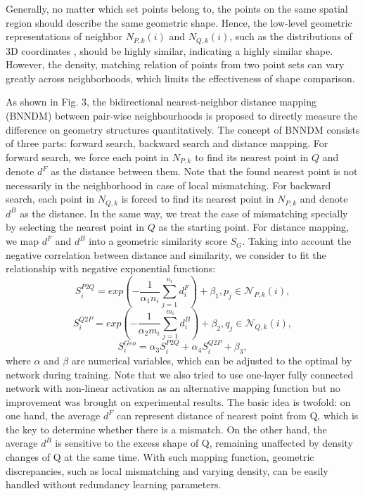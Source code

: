 \documentclass[letterpaper, 10 pt, conference]{ieeeconf}
\begin{document}
Generally, no matter which set points belong to, the points on the same spatial region should describe the same geometric shape. Hence, the low-level geometric representations of neighbor $N_{P,k}(i)$ and $N_{Q,k}(i)$, such as the distributions of 3D coordinates , should be highly similar, indicating a highly similar shape. However, the density, matching relation of points from two point sets can vary greatly across neighborhoods, which limits the effectiveness of shape comparison. 



As shown in Fig. 3, the bidirectional nearest-neighbor distance mapping (BNNDM) between pair-wise neighbourhoods is proposed to directly measure the difference on geometry structures quantitatively. The concept of BNNDM consists of three parts: forward search, backward search and distance mapping. For forward search, we force each point in $N_{P,k}$ to find its nearest point in $Q$ and denote $d^{F}$  as the distance between them. Note that the found nearest point is not necessarily in the neighborhood in case of local mismatching. For backward search, each point in $N_{Q,k}$ is forced to find its nearest point in $N_{P,k}$ and denote $d^{B}$ as the distance. In the same way, we treat the case of mismatching specially by selecting the nearest point in $Q$ as the starting point. For distance mapping, we map $d^{F}$ and $d^{B}$ into a geometric similarity score $S_{G}$. Taking into account the negative correlation between distance and similarity, we consider to fit the relationship with negative exponential functions:
\begin{equation}
S^{P2Q}_i = exp(-\frac{1}{\alpha_1 n_i}\sum_{j=1}^{n_i}d^{F}_i)+\beta_1,                   p_j\in{\mathcal{N}}_{P,k}(i),
\end{equation}
\begin{equation}
S^{Q2P}_i =  exp(-\frac{1}{\alpha_2 m_i}\sum_{j=1}^{m_i}d^{B}_i)+\beta_2,                                     q_j\in{\mathcal{N}}_{Q,k}(i),
\end{equation}
\begin{equation}
S^{Geo}_i =  \alpha_3 S^{P2Q}_i + \alpha_4 S^{Q2P}_i + \beta_3,
\end{equation}
where $\alpha$ and $\beta$ are numerical variables, which can be adjusted to the optimal by network during training. Note that we also tried to use one-layer fully connected network with non-linear activation as an alternative mapping function but no improvement was brought on experimental results. 
The basic idea is twofold: on one hand, the average $d^{F}$ can represent distance of nearest point from Q, which is the key to determine whether there is a mismatch. On the other hand, the average $d^{B}$ is sensitive to the excess shape of Q, remaining unaffected by density changes of Q at the same time.
With such mapping function, geometric discrepancies, such as local mismatching and varying density, can be easily handled without redundancy learning parameters.
\end{document}
